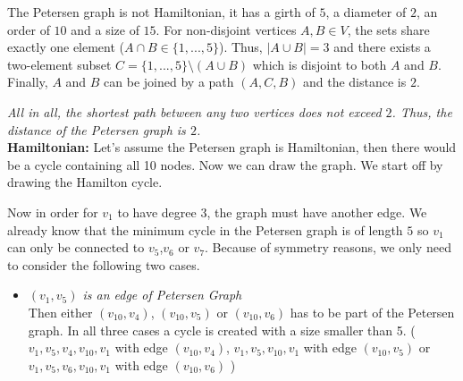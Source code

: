 \documentclass[a4paper]{article}
\begin{document}
\begin{solution}{9}
\begin{theorem}{The Petersen graph is not Hamiltonian, it has a girth of $5$, a diameter of $2$, an order of $10$ and a size of $15$.}
				For non-disjoint vertices $A, B \in V$, the sets share exactly one element ($A \cap B \in \{1, ..., 5\}$). Thus, $|A \cup B| = 3$ and there exists a two-element subset $C = \{1, ..., 5\} \setminus (A \cup B)$ which is disjoint to both $A$ and $B$. Finally, $A$ and $B$ can be joined by a path $(A, C, B)$ and the distance is $2$.

				\emph{All in all, the shortest path between any two vertices does not exceed $2$. Thus, the distance of the Petersen graph is $2$.}\\

			\textbf{Hamiltonian:}
			Let's assume the Petersen graph is Hamiltonian, then there would be a cycle containing all 10 nodes. 
			Now we can draw the graph. We start off by drawing the Hamilton cycle. 
			\begin{center}
			\end{center}
			Now in order for $v_1$ to have degree 3, the graph must have another edge. 
			We already know that the minimum cycle in the Petersen graph is of length $5$ so $v_1$ can only be connected to $v_5$,$v_6$ or $v_7$. 
			Because of symmetry reasons, we only need to consider the following two cases. 
			\begin{itemize}
				\item \emph{$(v_1,v_5)$ is an edge of Petersen Graph}\\
					Then either $(v_{10},v_4)$, $(v_{10},v_5)$ or $(v_{10},v_6)$ has to be part of the Petersen graph. 
					In all three cases a cycle is created with a size smaller than 5. 
					($v_1,v_5,v_4,v_{10},v_1$ with edge $(v_{10},v_4)$,  $v_1,v_5,v_{10},v_1$ with edge $(v_{10},v_5)$ or $v_1,v_5,v_6,v_{10},v_1$ with edge $(v_{10},v_6)$ )

\end{itemize}
\end{theorem}
\end{solution}
\end{document}
